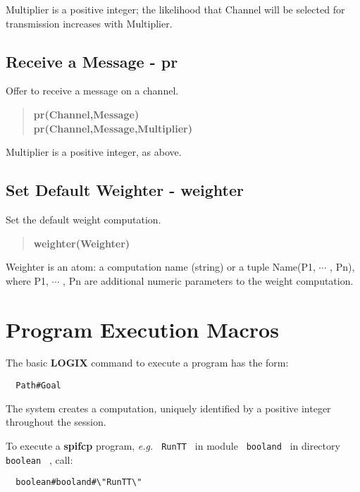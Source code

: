 \documentclass[twoside,10pt]{report}
\begin{document}
\noindent
Multiplier is a positive integer;
the likelihood that Channel will be selected for transmission
increases with Multiplier.

\subsection{Receive a Message - pr}

Offer to receive a message on a channel.

\begin{verse}
 {\bfseries
pr(Channel,Message) \\
pr(Channel,Message,Multiplier)
 }
\end{verse}

\noindent
Multiplier is a positive integer, as above.

\subsection{Set Default Weighter - weighter}
\label{weighter macro}

Set the default weight computation.

\begin{verse}
 {\bfseries
weighter(Weighter)
 }
\end{verse}

\noindent
Weighter  is an atom: a computation name
(string) or a tuple  Name(P1, $\cdots$ , Pn), where P1, $\cdots$ , Pn
are additional numeric parameters to the weight computation.


\section{Program Execution Macros}
\label{macros}

The basic {\bf LOGIX} command to execute a program has the form:

\begin{verbatim}
  Path#Goal
\end{verbatim}

\noindent
The system creates a computation, uniquely identified by a positive
integer throughout the session.

\noindent
To execute a {\bf spifcp} program, {\em e.g.} \verb+ RunTT + in
module \verb+ booland + in directory \verb+ boolean + , call:

\begin{verbatim}
  boolean#booland#\"RunTT\"
\end{verbatim}
\end{document}
